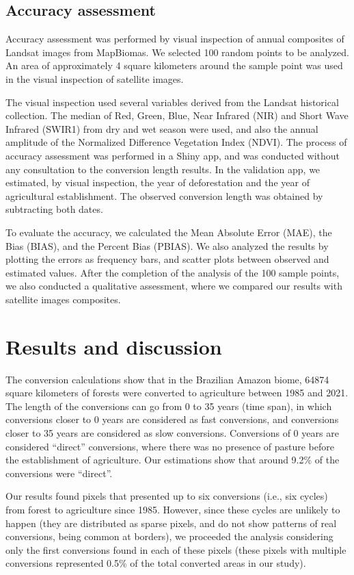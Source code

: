 \documentclass[essd, manuscript]{copernicus}
\begin{document}
\subsection{Accuracy assessment}

Accuracy assessment was performed by visual inspection of annual composites of Landsat images from MapBiomas.
We selected 100 random points to be analyzed.
An area of approximately 4 square kilometers around the sample point was used in the visual inspection of satellite images.

The visual inspection used several variables derived from the Landsat historical collection.
The median of Red, Green, Blue, Near Infrared (NIR) and Short Wave Infrared (SWIR1) from dry and wet season were used, and also the annual amplitude of the Normalized Difference Vegetation Index (NDVI).
The process of accuracy assessment was performed in a Shiny app, and was conducted without any consultation to the conversion length results.
In the validation app, we estimated, by visual inspection, the year of deforestation and the year of agricultural establishment.
The observed conversion length was obtained by subtracting both dates.

To evaluate the accuracy, we calculated the Mean Absolute Error (MAE), the Bias (BIAS), and the Percent Bias (PBIAS).
We also analyzed the results by plotting the errors as frequency bars, and scatter plots between observed and estimated values.
After the completion of the analysis of the 100 sample points, we also conducted a qualitative assessment, where we compared our results with satellite images composites.

\section{Results and discussion}

The conversion calculations show that in the Brazilian Amazon biome, 64874 square kilometers of forests were converted to agriculture between 1985 and 2021.
The length of the conversions can go from 0 to 35 years (time span), in which conversions closer to 0 years are considered as fast conversions, and conversions closer to 35 years are considered as slow conversions.
Conversions of 0 years are considered ``direct'' conversions, where there was no presence of pasture before the establishment of agriculture.
Our estimations show that around 9.2\% of the conversions were ``direct''.

Our results found pixels that presented up to six conversions (i.e., six cycles) from forest to agriculture since 1985.
However, since these cycles are unlikely to happen (they are distributed as sparse pixels, and do not show patterns of real conversions, being common at borders), we proceeded the analysis considering only the first conversions found in each of these pixels (these pixels with multiple conversions represented 0.5\% of the total converted areas in our study).
\end{document}
